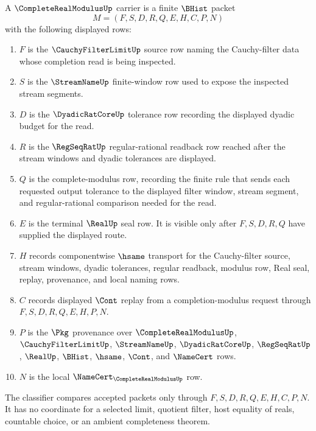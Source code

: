 \begin{definition}
\label{def:complete-real-modulus-carrier}
A $\CompleteRealModulusUp$ carrier is a finite $\BHist$ packet
$$
M=(F,S,D,R,Q,E,H,C,P,N)
$$
with the following displayed rows:
\begin{enumerate}
\item $F$ is the $\CauchyFilterLimitUp$ source row naming the Cauchy-filter data whose completion read is being inspected.
\item $S$ is the $\StreamNameUp$ finite-window row used to expose the inspected stream segments.
\item $D$ is the $\DyadicRatCoreUp$ tolerance row recording the displayed dyadic budget for the read.
\item $R$ is the $\RegSeqRatUp$ regular-rational readback row reached after the stream windows and dyadic tolerances are displayed.
\item $Q$ is the complete-modulus row, recording the finite rule that sends each requested output tolerance to the displayed filter window, stream segment, and regular-rational comparison needed for the read.
\item $E$ is the terminal $\RealUp$ seal row. It is visible only after $F,S,D,R,Q$ have supplied the displayed route.
\item $H$ records componentwise $\hsame$ transport for the Cauchy-filter source, stream windows, dyadic tolerances, regular readback, modulus row, Real seal, replay, provenance, and local naming rows.
\item $C$ records displayed $\Cont$ replay from a completion-modulus request through $F,S,D,R,Q,E,H,P,N$.
\item $P$ is the $\Pkg$ provenance over $\CompleteRealModulusUp$, $\CauchyFilterLimitUp$, $\StreamNameUp$, $\DyadicRatCoreUp$, $\RegSeqRatUp$, $\RealUp$, $\BHist$, $\hsame$, $\Cont$, and $\NameCert$ rows.
\item $N$ is the local $\NameCert_{\CompleteRealModulusUp}$ row.
\end{enumerate}
The classifier compares accepted packets only through $F,S,D,R,Q,E,H,C,P,N$. It has no coordinate for a selected limit, quotient filter, host equality of reals, countable choice, or an ambient completeness theorem.
\end{definition}

